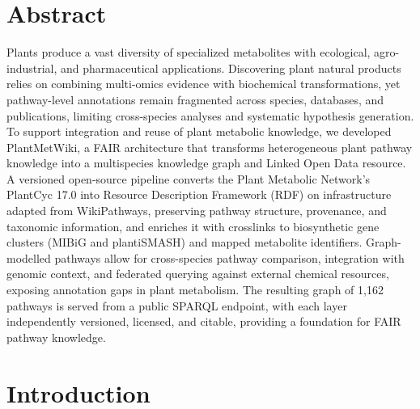 \documentclass[11pt,a4paper]{article}
\begin{document}
\vspace{1.5em}

\section*{Abstract}

Plants produce a vast diversity of specialized metabolites with ecological,
agro-industrial, and pharmaceutical applications. Discovering plant natural products relies on
combining multi-omics evidence with biochemical transformations, yet pathway-level annotations
remain fragmented across species, databases, and publications, limiting cross-species analyses
and systematic hypothesis generation. To support integration and reuse of plant metabolic
knowledge, we developed PlantMetWiki, a FAIR architecture that transforms heterogeneous plant pathway knowledge into a multispecies knowledge graph and Linked Open Data resource. 
A versioned open-source pipeline converts the Plant Metabolic Network's
PlantCyc 17.0 into Resource Description Framework (RDF) on infrastructure adapted from WikiPathways,
preserving pathway structure, provenance, and taxonomic information, and enriches it with
crosslinks to biosynthetic gene clusters (MIBiG and plantiSMASH) and mapped metabolite identifiers.
Graph-modelled pathways allow for cross-species pathway comparison, integration with genomic context, and federated querying
against external chemical resources, exposing annotation gaps in plant metabolism.
The resulting graph of 1,162 pathways is served from a public SPARQL endpoint, with each layer
independently versioned, licensed, and citable, providing a foundation for FAIR pathway knowledge.

\section*{Introduction}
\end{document}
